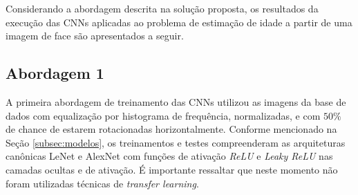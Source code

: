 
Considerando a abordagem descrita na solução proposta, os resultados da execução das CNNs aplicadas ao problema de estimação de idade a partir de uma imagem de face são apresentados a seguir.

%

\subsection{Abordagem 1}%
A primeira abordagem de treinamento das CNNs utilizou as imagens da base de dados com equalização por histograma de frequência, normalizadas, e com $50\%$ de chance de estarem rotacionadas horizontalmente. Conforme mencionado na Seção \ref{subsec:modelos}, os treinamentos e testes compreenderam as arquiteturas canônicas LeNet e AlexNet com funções de ativação \emph{ReLU} e \emph{Leaky ReLU} nas camadas ocultas e de ativação. É importante ressaltar que neste momento não foram utilizadas técnicas de \emph{transfer learning}.

